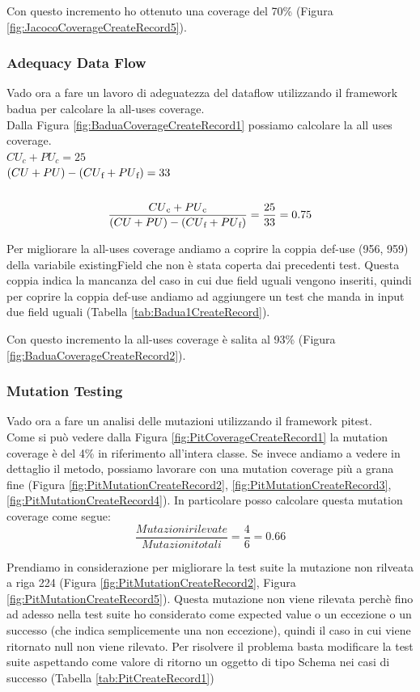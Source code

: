\documentclass[12pt, a4paper]{article}
\begin{document}
Con questo incremento ho ottenuto una coverage del 70\% (Figura \ref{fig:JacocoCoverageCreateRecord5}).


\subsubsection{Adequacy Data Flow}
Vado ora a fare un lavoro di adeguatezza del dataflow utilizzando il framework badua per calcolare la all-uses coverage. \\
Dalla Figura \ref{fig:BaduaCoverageCreateRecord1} possiamo calcolare la all uses coverage. \\

\(CU_c + PU_c = 25\) \\
\( (CU + PU) - (CU\textsubscript{f} + PU\textsubscript{f}) = 33\) \\ \\
\[\frac{{CU\textsubscript{c} + PU\textsubscript{c}}}{{(CU + PU) - (CU\textsubscript{f} + PU\textsubscript{f})}} = \frac{{25}}{{33}} = 0.75\]

Per migliorare la all-uses coverage andiamo a coprire la coppia def-use (956, 959) della variabile existingField che non 
è stata coperta dai precedenti test. Questa coppia indica la mancanza del caso in cui due field uguali vengono inseriti, 
quindi per coprire la coppia def-use andiamo ad aggiungere un test che manda in input due field uguali 
(Tabella \ref{tab:Badua1CreateRecord}).

Con questo incremento la all-uses coverage è salita al 93\% (Figura \ref{fig:BaduaCoverageCreateRecord2}).
\subsubsection{Mutation Testing}

Vado ora a fare un analisi delle mutazioni utilizzando il framework pitest. \\
Come si può vedere dalla Figura \ref{fig:PitCoverageCreateRecord1} la mutation coverage è del 4\% in riferimento 
all'intera classe. Se invece andiamo a vedere in dettaglio il metodo, possiamo lavorare con una mutation coverage 
più a grana fine (Figura \ref{fig:PitMutationCreateRecord2}, \ref{fig:PitMutationCreateRecord3}, \ref{fig:PitMutationCreateRecord4}).
In particolare posso calcolare questa mutation coverage come segue:
\[\frac{{Mutazioni rilevate}}{{Mutazioni totali}} = \frac{{4}}{{6}} = 0.66\]

Prendiamo in considerazione per migliorare la test suite la mutazione non rilveata a riga 224 
(Figura \ref{fig:PitMutationCreateRecord2}, Figura \ref{fig:PitMutationCreateRecord5}).
Questa mutazione non viene rilevata perchè fino ad adesso nella test suite ho considerato come expected value o un eccezione
o un successo (che indica semplicemente una non eccezione), quindi il caso in cui viene ritornato null non viene rilevato.
Per risolvere il problema basta modificare la test suite aspettando come valore di ritorno un oggetto di tipo Schema nei casi 
di successo (Tabella \ref{tab:PitCreateRecord1})
\end{document}
